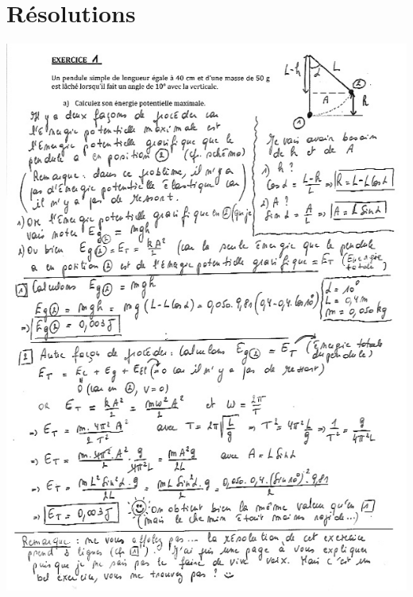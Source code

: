 \section{Résolutions }

 \includegraphics[width=15cm]{COURS2EnergieOHEXERCRESOL-img/COURS2EnergieOHEXERCRESOL-img007.png} 

